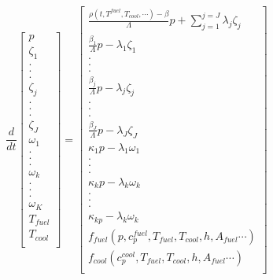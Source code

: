 

\begin{equation}
  \frac{d}{dt}\left[
    \begin{array}{c}
      p\\
      \zeta_1\\
      .\\
      .\\
      .\\
      \zeta_j\\
      .\\
      .\\
      .\\
      \zeta_J\\
      \omega_1\\
      .\\
      .\\
      .\\
      \omega_k\\
      .\\
      .\\
      .\\
      \omega_K\\
      T_{fuel}\\
      T_{cool}\\
    \end{array}
    \right]
    =
    \left[
      \begin{array}{ c }
        \frac{\rho(t,T^{fuel},T_{cool},\cdots)-\beta}{\Lambda}p +
        \displaystyle\sum^{j=J}_{j=1}\lambda_j\zeta_j\\
        \frac{\beta_1}{\Lambda} p - \lambda_1\zeta_1\\
        .\\
        .\\
        .\\
        \frac{\beta_j}{\Lambda}p-\lambda_j\zeta_j\\
        .\\
        .\\
        .\\
        \frac{\beta_J}{\Lambda}p-\lambda_J\zeta_J\\
        \kappa_1p - \lambda_1\omega_1\\
        .\\
        .\\
        .\\
        \kappa_kp - \lambda_k\omega_k\\
        .\\
        .\\
        .\\
        \kappa_{k p} - \lambda_k\omega_{k}\\
        f_{fuel}(p, c_p^{fuel}, T_{fuel}, T_{cool},h,A_{fuel}\cdots)\\
        f_{cool}(c_p^{cool}, T_{fuel}, T_{cool},h,A_{fuel}\cdots)\\
      \end{array}
      \right]
      \label{eqn:full_prke}
    \end{equation}

